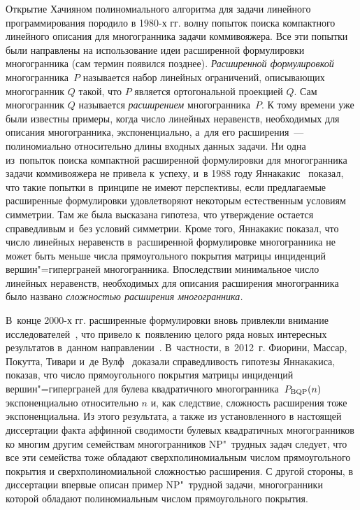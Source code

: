Открытие Хачияном полиномиального алгоритма для задачи линейного программирования породило в 1980-х гг. волну попыток поиска компактного линейного описания для многогранника задачи коммивояжера.
Все эти попытки были направлены на использование идеи расширенной формулировки многогранника 
(сам термин появился позднее). 
\emph{Расширенной формулировкой} многогранника~$P$ называется набор линейных ограничений,
описывающих многогранник $Q$ такой, что $P$ является ортогональной проекцией $Q$.
Сам многогранник $Q$ называется \emph{расширением} многогранника~$P$.
К тому времени уже были известны примеры, когда число линейных неравенств, необходимых для описания многогранника, экспоненциально, а~для его расширения~--- полиномиально относительно длины входных данных задачи.
Ни одна из~попыток поиска компактной расширенной формулировки для многогранника задачи коммивояжера не привела к~успеху, и~в 1988 году Яннакакис~\cite{Yannakakis:1988}
показал, что такие попытки в~принципе не имеют перспективы, 
если предлагаемые расширенные формулировки удовлетворяют некоторым естественным условиям симметрии.
Там же была высказана гипотеза, что утверждение остается справедливым и~без условий симметрии.
Кроме того, Яннакакис показал, что число линейных неравенств в~расширенной формулировке многогранника не может быть меньше числа прямоугольного покрытия матрицы инциденций вершин"=гиперграней многогранника.
Впоследствии минимальное число линейных неравенств, необходимых для описания расширения многогранника
было названо \emph{сложностью расширения многогранника.}

В~конце 2000-х гг. расширенные формулировки вновь привлекли внимание исследователей~\cite{Conforti:2010,Kaibel:2011}, 
что привело к~появлению целого ряда новых интересных результатов в~данном направлении~\cite{FioriniPokutta:2012, Fiorini:2012polygons, KaibelPT:12, FioriniKPT:13, Rothvoss:2013, Rothvoss:2014, KaibelW:15}.
В~частности, в~2012~г. Фиорини, Массар, Покутта, Тивари и~де Вулф~\cite{FioriniPokutta:2012} доказали справедливость гипотезы Яннакакиса, показав,
что число прямоугольного покрытия матрицы инциденций вершин"=гиперграней
для булева квадратичного многогранника~$P_{\textup{BQP}}(n)$ экспоненциально относительно $n$ и, как следствие, сложность расширения тоже экспоненциальна.
Из этого результата, а также из установленного в настоящей диссертации факта аффинной сводимости булевых квадратичных многогранников ко многим другим семействам многогранников NP"~трудных задач следует, что все эти семейства тоже обладают сверхполиномиальным числом прямоугольного покрытия и сверхполиномиальной сложностью расширения. 
С другой стороны, в диссертации впервые описан пример NP"~трудной задачи, многогранники которой обладают полиномиальным числом прямоугольного покрытия.

